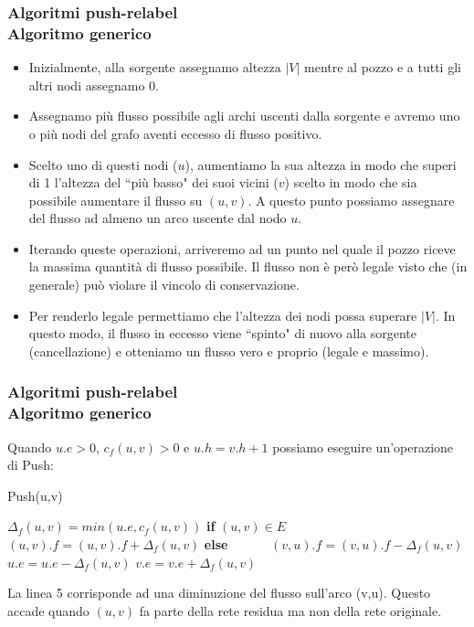 \documentclass{beamer}
\begin{document}
\begin{frame}
\frametitle{Algoritmi push-relabel\\Algoritmo generico}
\begin{itemize}
\item Inizialmente, alla sorgente assegnamo altezza $|V|$ mentre al pozzo e a tutti gli altri nodi assegnamo 0.
\item Assegnamo più flusso possibile agli archi uscenti dalla sorgente e avremo uno o più nodi del grafo aventi eccesso di flusso positivo.
\item Scelto uno di questi nodi ($u$), aumentiamo la sua altezza in modo che superi di 1 l'altezza del ``più basso" dei suoi vicini ($v$) scelto in modo che sia possibile aumentare il flusso su $(u,v)$. A questo punto possiamo assegnare del flusso ad almeno un arco uscente dal nodo $u$.
\item Iterando queste operazioni, arriveremo ad un punto nel quale il pozzo riceve la massima quantità di flusso possibile. Il flusso non è però legale visto che (in generale) può violare il vincolo di conservazione.
\item Per renderlo legale permettiamo che l'altezza dei nodi possa superare $|V|$. In questo modo, il flusso in eccesso viene ``spinto" di nuovo alla sorgente (cancellazione) e otteniamo un flusso vero e proprio (legale e massimo).
\end{itemize}
\end{frame}

\begin{frame}
\frametitle{Algoritmi push-relabel\\Algoritmo generico}
Quando $u.e>0$, $c_f(u,v)>0$ e $u.h=v.h+1$ possiamo eseguire un'operazione di Push:
\begin{algorithm}[H]
    \caption{Push(u,v)}%
    \begin{algorithmic}[1]
        \State $\Delta_f(u,v)=min(u.e,c_f(u,v))$
        \State \textbf{if} $(u,v)\in E$
        \State \ \ \ \ \ \ $(u,v).f = (u,v).f+\Delta_f(u,v)$
        \State \textbf{else}
        \State \ \ \ \ \ \ $(v,u).f = (v,u).f-\Delta_f(u,v)$
        \State $u.e=u.e-\Delta_f(u,v)$
        \State $v.e=v.e+\Delta_f(u,v)$
    \end{algorithmic}
    \label{alg_1}
\end{algorithm}
La linea 5 corrisponde ad una diminuzione del flusso sull'arco (v,u). Questo accade quando $(u,v)$ fa parte della rete residua ma non della rete originale.
\end{frame}
\end{document}

